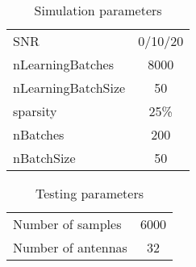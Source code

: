 \documentclass[a8paper,conference]{IEEEtran}
\begin{document}
\clearpage
\begin{table}[!hb]
	\centering
	\caption{Simulation parameters}
	\begin{tabular}{|l|c|}
	\hline
	SNR 					& 0/10/20 \\
	nLearningBatches 		& 8000 \\
	nLearningBatchSize 		& 50 \\
	sparsity 				& 25\% \\
	nBatches   				& 200 \\
	nBatchSize 				& 50 \\
	\hline
	\end{tabular}
\end{table}
\begin{table}[!hb]
	\centering
	\caption{Testing parameters}
	\begin{tabular}{|l|c|}
	\hline
	Number of samples       & 6000 \\
	Number of antennas 		& 32 \\
	\hline
	\end{tabular}
\end{table}
\end{document}
